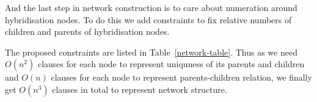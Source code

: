 \documentclass[runningheads, envcountsame, a4paper]{llncs}
\begin{document}
And the last step in network construction is to care about numeration around hybridisation nodes. To do this we add constraints to fix 
relative numbers of children and parents of hybridisation nodes. 

The proposed constraints are listed in Table~\ref{network-table}. Thus as we need $O(n^2)$ clauses for each node to represent uniquness of 
its parents and children and $O(n)$ clauses for each node to represent parents-children relation, we finally get $O(n^3)$ clauses in total 
to represent network structure.

\begin{table}
\centering
\caption{Clauses for network structure encoding}
\end{table}
\end{document}
